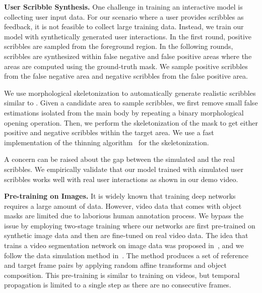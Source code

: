\documentclass[10pt,twocolumn,letterpaper]{article}
\renewcommand{\paragraph}[1]{\vspace{1mm}\noindent\textbf{#1}}
\begin{document}
\paragraph{User Scribble Synthesis.} 
One challenge in training an interactive model is collecting user input data. 
For our scenario where a user provides scribbles as feedback, it is not feasible to collect large training data. 
Instead, we train our model with synthetically generated user interactions. 
In the first round, positive scribbles are sampled from the foreground region.
In the following rounds, scribbles are synthesized within false negative and false positive areas where the areas are computed using the ground-truth mask. 
We sample positive scribbles from the false negative area and negative scribbles from the false positive area. 

We use morphological skeletonization to automatically generate realistic scribbles similar to \cite{caelles20182018}.
Given a candidate area to sample scribbles, we first remove small false estimations isolated from the main body by repeating a binary morphological opening operation. 
Then, we perform the skeletonization of the mask to get either positive and negative scribbles within the target area. We use a fast implementation of the thinning algorithm~\cite{Guo:1989:PTT:62065.62074} for the skeletonization.

A concern can be raised about the gap between the simulated and the real scribbles. 
We empirically validate that our model trained with simulated user scribbles works well with real user interactions as shown in our demo video.


\paragraph{Pre-training on Images.}
It is widely known that training deep networks requires a large amount of data. 
However, video data that comes with object masks are limited due to laborious human annotation process. 
We bypass the issue by employing two-stage training where our networks are first pre-trained on synthetic image data and then are fine-tuned on real video data. 
The idea that trains a video segmentation network on image data was proposed in~\cite{perazzi2017learning}, and we follow the data simulation method in~\cite{oh2018fast}. 
The method produces a set of reference and target frame pairs by applying random affine transforms and object composition. 
This pre-training is similar to training on videos, but temporal propagation is limited to a single step as there are no consecutive frames. 
\end{document}
